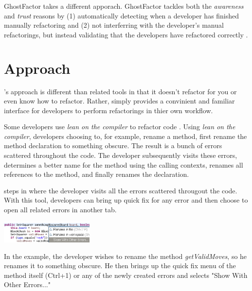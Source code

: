 \documentclass{sigplanconf}
\begin{document}
GhostFactor takes a different apporach. GhostFactor tackles both the
\textit{awareness} and \textit{trust} reasons by (1) automatically detecting
when a developer has finished manually refactoring and (2) not interferring with
the developer's manual
refactorings, but instead validating that the developers have refactored
correctly \cite{ghost-factor}.

\section{Approach}
\pname{}'s approach is different than related tools in that it doesn't refactor
for you or even know how to refactor. Rather, \pname{} simply provides a
convinient and familiar interface for developers to perform refactorings in
thier own workflow.

Some developers use \textit{lean on the compiler} to refactor code
\cite{legacy-code}. Using \textit{lean on the compiler},
developers choosing to, for example, rename a method, first rename the method
declaration to something obscure. The result
is a bunch of errors scattered throughout the code. The developer subsequently
visits these errors, determines a better name for the method using the calling
contexts, renames all references to the method, and finally renames the
declaration.

\pname{} steps in where the developer visits all the errors scattered througout
the code. With this tool, developers can bring up quick fix for any error and
then choose to open all related errors in another tab.
\begin{center}
\includegraphics[width=0.35\textwidth]{quick-fix.png}
\end{center}

In the example, the developer wishes to rename the method
\textit{getValidMoves}, so he renames
it to something obscure. He then brings up the quick fix menu of the method
itself (Ctrl+1) or any of the newly created errors and selects
"Show With Other Errors..."
\end{document}
